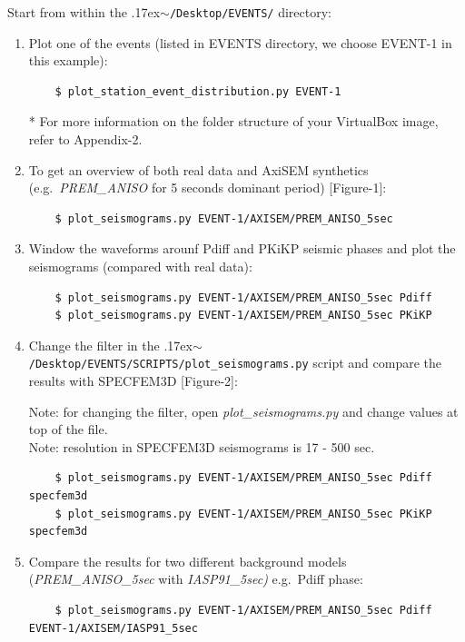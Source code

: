 \documentclass{article}
\newcommand{\ttilde}[0]{\raise.17ex\hbox{$\scriptstyle\sim$}}
\begin{document}
Start from within the \ttilde\verb|/Desktop/EVENTS/| directory:

\begin{enumerate}

    \item Plot one of the events (listed in EVENTS directory, we choose EVENT-1
    in this example):

    \begin{verbatim}
    $ plot_station_event_distribution.py EVENT-1
    \end{verbatim}
    * For more information on the folder structure of your VirtualBox image,
    refer to Appendix-2.

    \item To get an overview of both real data and AxiSEM synthetics
    (e.g.\ \textit{PREM\_ANISO} for 5 seconds dominant period) [Figure-1]:
    \begin{verbatim}
    $ plot_seismograms.py EVENT-1/AXISEM/PREM_ANISO_5sec
    \end{verbatim}

    \item Window the waveforms arounf Pdiff and PKiKP seismic phases and plot
    the seismograms (compared with real data):
    \begin{verbatim}
    $ plot_seismograms.py EVENT-1/AXISEM/PREM_ANISO_5sec Pdiff
    $ plot_seismograms.py EVENT-1/AXISEM/PREM_ANISO_5sec PKiKP
    \end{verbatim}

    \item Change the filter in the
    \ttilde\verb|/Desktop/EVENTS/SCRIPTS/plot_seismograms.py| script and
    compare the results with SPECFEM3D [Figure-2]:

    Note: for changing the filter, open \textit{plot\_seismograms.py} and
    change values at top of the file. \\
    Note: resolution in SPECFEM3D seismograms is 17 - 500 sec.
    \begin{verbatim}
    $ plot_seismograms.py EVENT-1/AXISEM/PREM_ANISO_5sec Pdiff specfem3d
    $ plot_seismograms.py EVENT-1/AXISEM/PREM_ANISO_5sec PKiKP specfem3d
    \end{verbatim}

    \item Compare the results for two different background models
    (\textit{PREM\_ANISO\_5sec} with \textit{IASP91\_5sec)} e.g.\ Pdiff phase:

    \begin{verbatim}
    $ plot_seismograms.py EVENT-1/AXISEM/PREM_ANISO_5sec Pdiff EVENT-1/AXISEM/IASP91_5sec
    \end{verbatim}


\end{enumerate}
\end{document}
